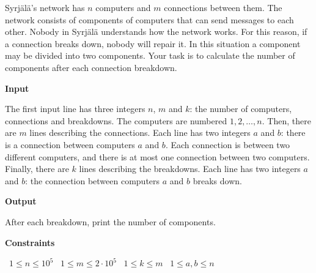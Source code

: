 Syrjälä's network has $n$ computers and $m$ connections between them. The network consists of components of computers that can send messages to each other.
Nobody in Syrjälä understands how the network works. For this reason, if a connection breaks down, nobody will repair it. In this situation a component may be divided into two components.
Your task is to calculate the number of components after each connection breakdown.

\vspace{0.3cm}\noindent\textbf{Input}

The first input line has three integers $n$, $m$ and $k$: the number of computers, connections and breakdowns. The computers are numbered $1,2,\dots,n$.
Then, there are $m$ lines describing the connections. Each line has two integers $a$ and $b$: there is a connection between computers $a$ and $b$. Each connection is between two different computers, and there is at most one connection between two computers.
Finally, there are $k$ lines describing the breakdowns. Each line has two integers $a$ and $b$: the connection between computers $a$ and $b$ breaks down.

\vspace{0.3cm}\noindent\textbf{Output}

After each breakdown, print the number of components.

\vspace{0.3cm}\noindent\textbf{Constraints}

\textbullet\ $1 \le n \le 10^5$
\textbullet\ $1 \le m \le 2 \cdot 10^5$
\textbullet\ $1 \le k \le m$
\textbullet\ $1 \le a,b \le n$